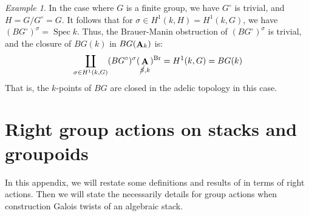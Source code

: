\documentclass[12pt, final]{amsart}
\theoremstyle{remark}
\newtheorem{example}{Example}[section]
\theoremstyle{definition}
\theoremstyle{plain}
\DeclareMathOperator{\bA}{{\bf A}}
\newcommand{\cS}{\cancel{S}}
\DeclareMathOperator{\Spec}{Spec}
\DeclareMathOperator{\Br}{Br}
\begin{document}
\begin{example}
    In the case where $G$ is a finite group, we have $G^\circ$ is trivial,
    and $H = G/G^\circ = G$. It follows that for 
    $\sigma \in H^1(k,H) = H^1(k,G)$, we have
    $(BG^\circ)^\sigma = \Spec k$. Thus, the Brauer-Manin obstruction
    of $(BG^\circ)^\sigma$ is trivial, and the closure of $BG(k)$ 
    in $BG(\bA_k)$ is:
    $$\coprod_{\sigma \in H^1(k,G)}(BG^\circ)^\sigma(\bA_{\cS,k})^{\Br} = H^1(k,G)= BG(k)$$
    That is, the $k$-points of $BG$ are closed in the adelic topology in this case.
\end{example}


\appendix
\section{Right group actions on stacks and groupoids}\label{appendix}

In this appendix, we will restate some definitions and results of \cite{ginot} in terms of right actions. Then we will state the necessarily details for group actions when construction Galois twists of an algebraic stack.
\end{document}
